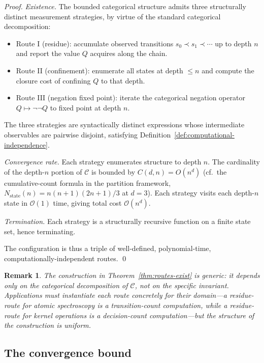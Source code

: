 \documentclass[twocolumn,11pt,a4paper]{article}
\newtheorem{remark}[theorem]{Remark}
\newcommand{\Inv}{Q}
\newcommand{\Depth}{n}
\newcommand{\Dim}{d}
\begin{document}
\begin{proof}
\emph{Existence.} The bounded categorical structure admits three structurally distinct measurement strategies, by virtue of the standard categorical decomposition:
\begin{itemize}[nosep,leftmargin=*]
\item Route I (residue): accumulate observed transitions $s_0 \prec s_1 \prec \cdots$ up to depth $\Depth$ and report the value $\Inv$ acquires along the chain.
\item Route II (confinement): enumerate all states at depth $\leq \Depth$ and compute the closure cost of confining $\Inv$ to that depth.
\item Route III (negation fixed point): iterate the categorical negation operator $\Inv \mapsto \neg\neg\Inv$ to fixed point at depth $\Depth$.
\end{itemize}
The three strategies are syntactically distinct expressions whose intermediate observables are pairwise disjoint, satisfying Definition~\ref{def:computational-independence}.

\emph{Convergence rate.} Each strategy enumerates structure to depth $\Depth$. The cardinality of the depth-$\Depth$ portion of $\mathcal{C}$ is bounded by $C(\Dim, \Depth) = O(\Depth^{\Dim})$ (cf.\ the cumulative-count formula in the partition framework, $N_{\mathrm{state}}(\Depth) = \Depth(\Depth+1)(2\Depth+1)/3$ at $\Dim = 3$). Each strategy visits each depth-$\Depth$ state in $\mathcal{O}(1)$ time, giving total cost $\mathcal{O}(\Depth^{\Dim})$.

\emph{Termination.} Each strategy is a structurally recursive function on a finite state set, hence terminating.

The configuration is thus a triple of well-defined, polynomial-time, computationally-independent routes. \qed
\end{proof}

\begin{remark}
The construction in Theorem~\ref{thm:routes-exist} is generic: it depends only on the categorical decomposition of $\mathcal{C}$, not on the specific invariant. Applications must instantiate each route concretely for their domain---a residue-route for atomic spectroscopy is a transition-count computation, while a residue-route for kernel operations is a decision-count computation---but the structure of the construction is uniform.
\end{remark}

\subsection{The convergence bound}
\end{document}
